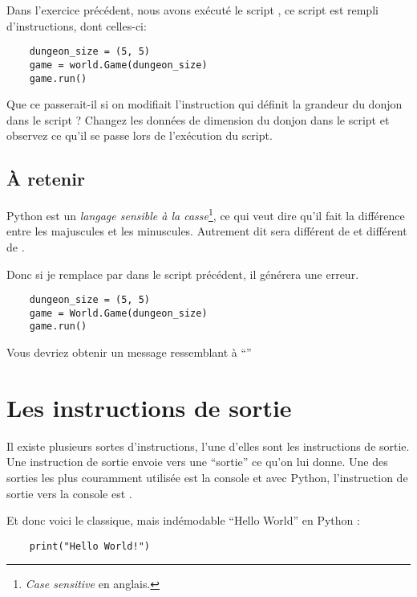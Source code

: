 Dans l’exercice précédent, nous avons exécuté le script , ce script est rempli d’instructions, dont celles-ci:

\begin{lstlisting}
    dungeon_size = (5, 5)
    game = world.Game(dungeon_size)
    game.run()
\end{lstlisting}

Que ce passerait-il si on modifiait l’instruction qui définit la grandeur du donjon dans le script ?
Changez les données de dimension du donjon dans le script et observez ce qu'il se passe lors de l'exécution du script.

\subsection{\`{A} retenir}

Python est un \emph{langage sensible à la casse}\footnote{\textit{Case sensitive} en anglais.}, ce qui veut dire qu'il fait la différence entre les majuscules et les minuscules. Autrement dit  sera différent de  et  différent de .

Donc si je remplace  par  dans le script précédent, il générera une erreur.

\begin{lstlisting}
    dungeon_size = (5, 5)
    game = World.Game(dungeon_size)
    game.run()
\end{lstlisting}

Vous devriez obtenir un message ressemblant à ``''

\section{Les instructions de sortie}

Il existe plusieurs sortes d’instructions, l’une d’elles sont les instructions de sortie.
Une instruction de sortie envoie vers une “sortie” ce qu’on lui donne.
Une des sorties les plus couramment utilisée est la console et avec Python, l’instruction de sortie vers la console est .

Et donc voici le classique, mais indémodable “Hello World” en Python :

\begin{lstlisting}
    print("Hello World!")
\end{lstlisting}


